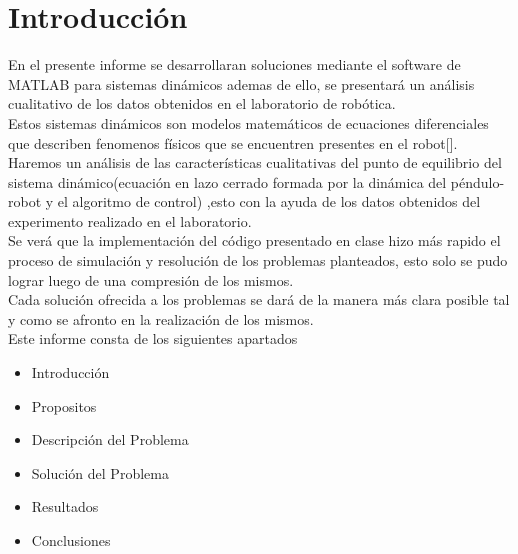 \documentclass[12pt]{article}
\begin{document}
\section{Introducción}
En el presente informe se desarrollaran soluciones mediante el software de MATLAB para sistemas dinámicos ademas de ello, se presentará un análisis cualitativo de los datos obtenidos 
en el laboratorio de robótica.\vspace{4mm}
\\ 
Estos sistemas dinámicos son modelos matemáticos de ecuaciones diferenciales que describen fenomenos físicos que se encuentren presentes en 
el robot[\cite{reyes2011robotica}].\vspace{4mm} 
\\
Haremos un análisis de las características cualitativas del punto de equilibrio del sistema dinámico(ecuación en lazo cerrado formada por la dinámica del péndulo-robot y el algoritmo de control)
,esto con la ayuda de los datos obtenidos del experimento realizado en el laboratorio.\vspace{4mm}
\\
Se verá que la implementación del código presentado en clase hizo más rapido el proceso de simulación y resolución de los problemas planteados, esto solo se pudo lograr luego de 
una compresión de los mismos.\vspace{4mm}
\\
Cada solución ofrecida a los problemas se dará de la manera 
más clara posible tal y como se afronto en la realización de los mismos.\vspace{4mm}
\\ 
Este informe consta de los siguientes apartados

\begin{itemize}
    \item Introducción
    \item Propositos
    \item Descripción del Problema
    \item Solución del Problema
    \item Resultados
    \item Conclusiones
\end{itemize}
\end{document}

